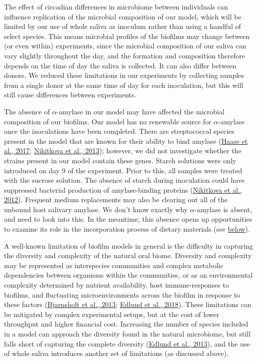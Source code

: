 \documentclass[
  b5paper,
]{book}
\begin{document}
The effect of circadian differences in microbiome between individuals
can influence replication of the microbial composition of our model,
which will be limited by our use of whole saliva as inoculum rather than
using a handful of select species. This means microbial profiles of the
biofilms may change between (or even within) experiments, since the
microbial composition of our saliva can vary slightly throughout the
day, and the formation and composition therefore depends on the time of
day the saliva is collected. It can also differ between donors. We
reduced these limitations in our experiments by collecting samples from
a single donor at the same time of day for each inoculation, but this
will still cause differences between experiments.

The absence of \(\alpha\)-amylase in our model may have affected the
microbial composition of our biofilms. Our model has no renewable source
for \(\alpha\)-amylase once the inoculations have been completed. There
are streptococcal species present in the model that are known for their
ability to bind amylase
(\protect\hyperlink{ref-haaseComparativeGenomics2017}{Haase et al.,
2017}; \protect\hyperlink{ref-nikitkovaStarchBiofilms2013}{Nikitkova et
al., 2013}); however, we did not investigate whether the strains present
in our model contain these genes. Starch solutions were only introduced
on day 9 of the experiment. Prior to this, all samples were treated with
the sucrose solution. The absence of starch during inoculation could
have suppressed bacterial production of amylase-binding proteins
(\protect\hyperlink{ref-nikitkovaEffectStarch2012}{Nikitkova et al.,
2012}). Frequent medium replacements may also be clearing out all of the
unbound host salivary amylase. We don't know exactly why
\(\alpha\)-amylase is absent, and need to look into this. In the
meantime, this absence opens up opportunities to examine its role in the
incorporation process of dietary materials (see
\protect\hyperlink{bfmodels-in-arch}{below}).

A well-known limitation of biofilm models in general is the difficulty
in capturing the diversity and complexity of the natural oral biome.
Diversity and complexity may be represented as interspecies communities
and complex metabolic dependencies between organisms within the
communities, or as an environmental complexity determined by nutrient
availability, host immune-responses to biofilms, and fluctuating
microenvironments across the biofilm in response to these factors
(\protect\hyperlink{ref-bjarnsholtVivoBiofilm2013}{Bjarnsholt et al.,
2013}; \protect\hyperlink{ref-edlundUncoveringComplex2018}{Edlund et
al., 2018}). These limitations can be mitigated by complex experimental
setups, but at the cost of lower throughput and higher financial cost.
Increasing the number of species included in a model can approach the
diversity found in the natural microbiome, but still falls short of
capturing the complete diversity
(\protect\hyperlink{ref-edlundBiofilmModel2013}{Edlund et al., 2013}),
and the use of whole saliva introduces another set of limitations (as
discussed above).
\end{document}
